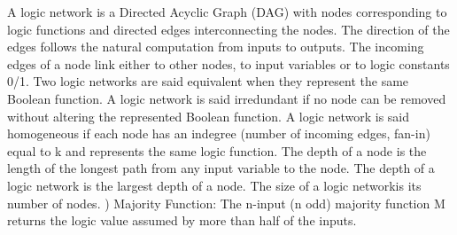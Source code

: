 \documentclass[
	accentcolor=1c,%
	type=intern,
	marginpar=false,
	ruledheaders=section,
	class=report,
	BCOR=5mm,
      parskip=half-,
	fontsize=10pt
	]{tudapub}
\begin{document}
{A logic network is a Directed Acyclic Graph (DAG) with nodes corresponding to logic functions 
and directed edges interconnecting the nodes. The direction of the edges follows the natural 
computation from inputs to outputs. The incoming edges of a node link either to other nodes, 
to input variables or to logic constants 0/1. Two logic networks are said equivalent when they 
represent the same Boolean function. A logic network is said irredundant if no node can be 
removed without altering the represented Boolean function. A logic network is said homogeneous
if each node has an indegree (number of incoming edges, fan-in) equal to k and represents the
same logic function. The depth of a node is the length of the longest path from any input
variable to the node. The depth of a logic network is the largest depth of a node. 
The size of a logic networkis its number of nodes.
\newline
{})	Majority Function: \newline
The n-input (n odd) majority function M returns the logic value assumed by more than half 
of the inputs.
\newline
}

\newpage
\end{document}

